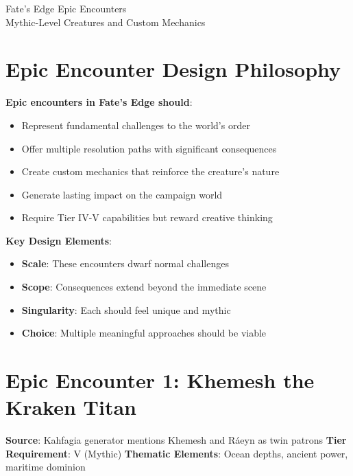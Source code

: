 \documentclass[11pt]{article}
\begin{document}
\begin{center}
{\LARGE Fate's Edge Epic Encounters}\\
\vspace{0.5em}
{\large Mythic-Level Creatures and Custom Mechanics}
\end{center}

\section*{Epic Encounter Design Philosophy}

\begin{mdframed}[backgroundcolor=epicbg]
\textbf{Epic encounters in Fate's Edge should}:
\begin{itemize}[leftmargin=*]
\item Represent fundamental challenges to the world's order
\item Offer multiple resolution paths with significant consequences
\item Create custom mechanics that reinforce the creature's nature
\item Generate lasting impact on the campaign world
\item Require Tier IV-V capabilities but reward creative thinking
\end{itemize}

\textbf{Key Design Elements}:
\begin{itemize}[leftmargin=*]
\item \textbf{Scale}: These encounters dwarf normal challenges
\item \textbf{Scope}: Consequences extend beyond the immediate scene
\item \textbf{Singularity}: Each should feel unique and mythic
\item \textbf{Choice}: Multiple meaningful approaches should be viable
\end{itemize}
\end{mdframed}

\section*{Epic Encounter 1: Khemesh the Kraken Titan}

\begin{mdframed}[backgroundcolor=epicbg]
\textbf{Source}: Kahfagia generator mentions Khemesh and Ráeyn as twin patrons
\textbf{Tier Requirement}: V (Mythic)
\textbf{Thematic Elements}: Ocean depths, ancient power, maritime dominion
\end{mdframed}
\end{document}
